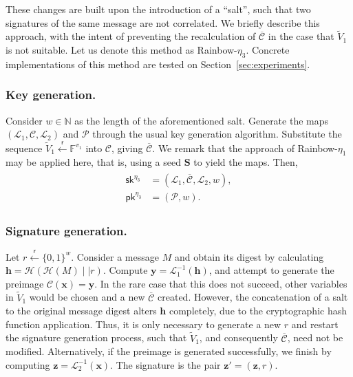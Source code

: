 \documentclass[12pt, a4paper, oneside]{memoir}
\newcommand{\random}{\overset{\mathsf{r}}{\gets}}
\theoremstyle{definition}
\begin{document}
These changes are built upon the introduction of a ``salt'', such that two signatures of the same message are not correlated. We briefly describe this approach, with the intent of preventing the recalculation of $\overline{\mathcal{C}}$ in the case that $\widetilde{V}_{1}$ is not suitable. Let us denote this method as Rainbow-$\eta_{3}$. Concrete implementations of this method are tested on Section~\ref{sec:experiments}.

\subsubsection{Key generation.}

Consider $w \in \mathbb{N}$ as the length of the aforementioned salt. Generate the maps $(\mathcal{L}_{1}, \mathcal{C}, \mathcal{L}_{2})$ and $\mathcal{P}$ through the usual key generation algorithm. Substitute the sequence $\widetilde{V}_{1} \random \mathbb{F}^{v_{1}}$ into $\mathcal{C}$, giving $\overline{\mathcal{C}}$. We remark that the approach of Rainbow-$\eta_{1}$ may be applied here, that is, using a seed $\mathbf{S}$ to yield the maps. Then,
\begin{align}
  \begin{split}
    \mathsf{sk}^{\eta_{3}} &= (\mathcal{L}_{1}, \overline{\mathcal{C}}, \mathcal{L}_{2}, w), \\
    \mathsf{pk}^{\eta_{3}} &= (\mathcal{P}, w).
  \end{split}
\end{align}

\subsubsection{Signature generation.}

Let $r \random {\{0, 1\}}^{w}$. Consider a message $M$ and obtain its digest by calculating $\mathbf{h} = \mathcal{H}(\mathcal{H}(M) \mid\mid r)$. Compute $\mathbf{y} = \mathcal{L}_{1}^{-1}(\mathbf{h})$, and attempt to generate the preimage $\mathcal{C}(\mathbf{x}) = \mathbf{y}$. In the rare case that this does not succeed, other variables in $\widetilde{V}_{1}$ would be chosen and a new $\overline{\mathcal{C}}$ created. However, the concatenation of a salt to the original message digest alters $\mathbf{h}$ completely, due to the cryptographic hash function application. Thus, it is only necessary to generate a new $r$ and restart the signature generation process, such that $\widetilde{V}_{1}$, and consequently $\overline{\mathcal{C}}$, need not be modified. Alternatively, if the preimage is generated successfully, we finish by computing $\mathbf{z} = \mathcal{L}_{2}^{-1}(\mathbf{x})$. The signature is the pair $\mathbf{z'} = (\mathbf{z}, r)$.
\end{document}
